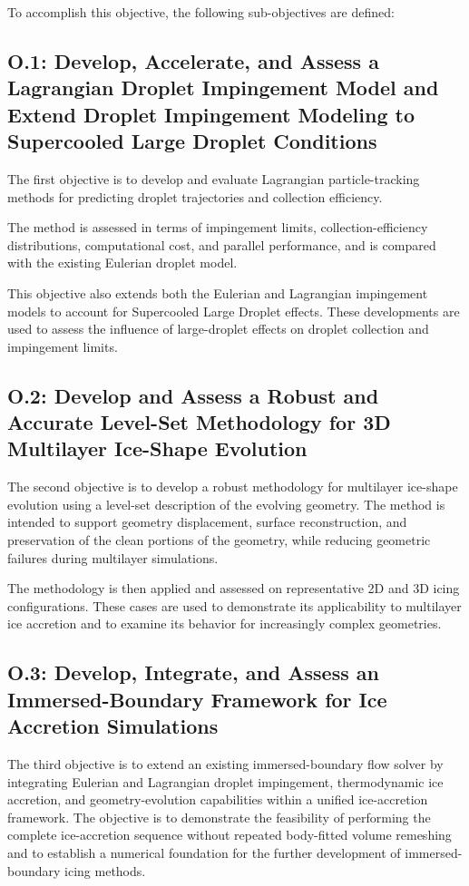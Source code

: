 To accomplish this objective, the following sub-objectives are defined:

\subsection*{O.1: Develop, Accelerate, and Assess a Lagrangian Droplet Impingement Model and Extend Droplet Impingement Modeling to Supercooled Large Droplet Conditions}

The first objective is to develop and evaluate Lagrangian particle-tracking methods for predicting droplet trajectories and collection efficiency.

The method is assessed in terms of impingement limits, collection-efficiency distributions, computational cost, and parallel performance, and is compared with the existing Eulerian droplet model.

This objective also extends both the Eulerian and Lagrangian impingement models to account for Supercooled Large Droplet effects.
These developments are used to assess the influence of large-droplet effects on droplet collection and impingement limits.

\subsection*{O.2: Develop and Assess a Robust and Accurate Level-Set Methodology for 3D Multilayer Ice-Shape Evolution}

The second objective is to develop a robust methodology for multilayer ice-shape evolution using a level-set description of the evolving geometry.
The method is intended to support geometry displacement, surface reconstruction, and preservation of the clean portions of the geometry, while reducing geometric failures during multilayer simulations.

The methodology is then applied and assessed on representative 2D and 3D icing configurations.
These cases are used to demonstrate its applicability to multilayer ice accretion and to examine its behavior for increasingly complex geometries.

\subsection*{O.3: Develop, Integrate, and Assess an Immersed-Boundary Framework for Ice Accretion Simulations}

The third objective is to extend an existing immersed-boundary flow solver by integrating Eulerian and Lagrangian droplet impingement, thermodynamic ice accretion, and geometry-evolution capabilities within a unified ice-accretion framework.
The objective is to demonstrate the feasibility of performing the complete ice-accretion sequence without repeated body-fitted volume remeshing and to establish a numerical foundation for the further development of immersed-boundary icing methods.


